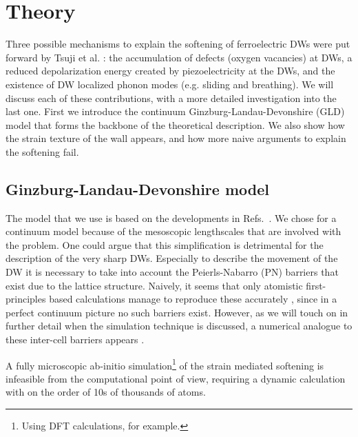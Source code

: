 \section{Theory}
Three possible mechanisms to explain the softening of ferroelectric DWs were put forward by Tsuji et al. \cite{Tsuji2005}: the accumulation of defects (oxygen vacancies) at DWs, a reduced depolarization energy created by piezoelectricity at the DWs, and the existence of DW localized phonon modes (e.g. sliding and breathing). We will discuss each of these contributions, with a more detailed investigation into the last one.
First we introduce the continuum Ginzburg-Landau-Devonshire (GLD) model that forms the backbone of the theoretical description.
We also show how the strain texture of the wall appears, and how more naive arguments to explain the softening fail.

\subsection{Ginzburg-Landau-Devonshire model}
The model that we use is based on the developments in Refs.~\cite{Zhirnov1959,L.N.Bulaevskii1963,Marton2010}.
We chose for a continuum model because of the mesoscopic lengthscales that are involved with the problem.
One could argue that this simplification is detrimental for the description of the very sharp DWs.
Especially to describe the movement of the DW it is necessary to take into account the Peierls-Nabarro (PN) barriers that exist due to the lattice structure.
Naively, it seems that only atomistic first-principles based calculations manage to reproduce these accurately \cite{Meyer2002}, since in a perfect continuum picture no such barriers exist.
However, as we will touch on in further detail when the simulation technique is discussed, a numerical analogue to these inter-cell barriers appears \cite{Marton2018}.

A fully microscopic ab-initio simulation\footnote{Using DFT calculations, for example.} of the strain mediated softening is infeasible from the computational point of view, requiring a dynamic calculation with on the order of 10s of thousands of atoms.


